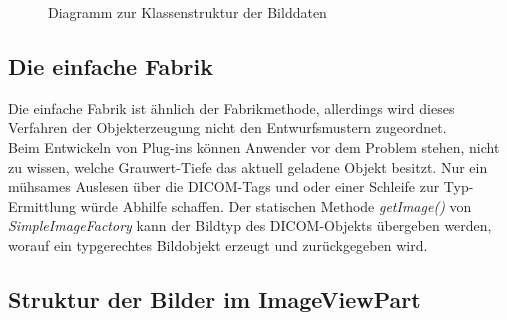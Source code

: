 \begin{figure}[htbp]
  \vspace{0.5cm}
  \centering
  \caption{Diagramm zur Klassenstruktur der Bilddaten}
  \label{imagemodel}
  \vspace{0.5cm}
\end{figure}

\subsection{Die einfache Fabrik}

Die einfache Fabrik ist ähnlich der Fabrikmethode, allerdings wird dieses Verfahren der Objekterzeugung nicht den Entwurfsmustern zugeordnet.\\
Beim Entwickeln von Plug-ins können Anwender vor dem Problem stehen, nicht zu wissen, welche Grauwert-Tiefe das aktuell geladene Objekt besitzt. Nur ein mühsames Auslesen über die DICOM-Tags und oder einer Schleife zur Typ-Ermittlung würde Abhilfe schaffen. Der statischen Methode \textit{getImage()} von \textit{SimpleImageFactory} kann der Bildtyp des DICOM-Objekts übergeben werden, worauf ein typgerechtes Bildobjekt erzeugt und zurückgegeben wird.

\subsection{Struktur der Bilder im ImageViewPart} \label{ivp_architecture}


